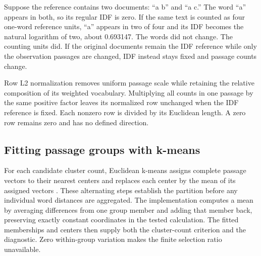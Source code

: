 \documentclass[10pt,letterpaper]{article}
\begin{document}
Suppose the reference contains two documents: “a b” and “a c.” The word “a” appears in both, so its regular IDF is zero. If the same text is counted as four one-word reference units, “a” appears in two of four and its IDF becomes the natural logarithm of two, about 0.693147. The words did not change. The counting units did. If the original documents remain the IDF reference while only the observation passages are changed, IDF instead stays fixed and passage counts change.\par

Row L2 normalization removes uniform passage scale while retaining the relative composition of its weighted vocabulary. Multiplying all counts in one passage by the same positive factor leaves its normalized row unchanged when the IDF reference is fixed. Each nonzero row is divided by its Euclidean length. A zero row remains zero and has no defined direction.\par

\subsection{Fitting passage groups with k-means}
For each candidate cluster count, Euclidean k-means assigns complete passage vectors to their nearest centers and replaces each center by the mean of its assigned vectors \cite{macqueen,lloyd}. These alternating steps establish the partition before any individual word distances are aggregated. The implementation computes a mean by averaging differences from one group member and adding that member back, preserving exactly constant coordinates in the tested calculation. The fitted memberships and centers then supply both the cluster-count criterion and the diagnostic. Zero within-group variation makes the finite selection ratio unavailable.\par
\end{document}

